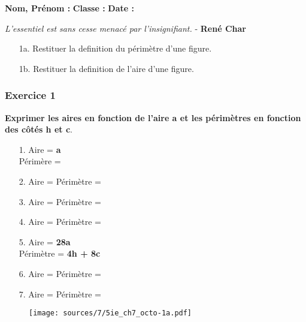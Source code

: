 \documentclass[10pt]{article}
\newcommand{\Pointille}[1][3]{\multido{}{#1}{ \makebox[\linewidth]{\dotfill}\\[\parskip]}}
\begin{document}

\textbf{Nom, Prénom :} \hspace{8cm} \textbf{Classe :} \hspace{3cm} \textbf{Date :}\\

\vspace{-0.4cm}
\begin{center}
  \textit{L’essentiel est sans cesse menacé par l’insignifiant.}  - \textbf{René Char}
\end{center}


\begin{enumerate}
\item[1a.] Restituer la definition du périmètre d'une figure.\\
  \Pointille[2]
\item[1b.] Restituer la definition de l'aire d'une figure.\\
  \Pointille[2]
\end{enumerate}

\begin{minipage}{0.4\linewidth}

  \subsubsection*{Exercice 1}

  \textbf{Exprimer les aires en fonction de l'aire a et les périmètres en fonction des côtés h et c}.

  \begin{enumerate}
  \item[1.] Aire = \textbf{a}\\
    Périmère = \Pointille[1]
  \item[2.] Aire = \Pointille[1]
    Périmètre = \Pointille[1]
  \item[3.] Aire = \Pointille[1]
    Périmètre = \Pointille[1]
  \item[4.] Aire = \Pointille[1]
    Périmètre = \Pointille[1]
  \item[5.] Aire = \textbf{28a}\\
    Périmètre = \textbf{4h + 8c}
  \item[6.] Aire = \Pointille[1]
    Périmètre = \Pointille[1]
  \item[7.] Aire = \Pointille[1]
    Périmètre = \Pointille[1]
  \end{enumerate}
  
\end{minipage}
\begin{minipage}{0.7\linewidth}

  \begin{figure}[H]
    \centering
    \texttt{[image: sources/7/5ie\_ch7\_octo-1a.pdf]}
  \end{figure}

\end{minipage}
\end{document}
